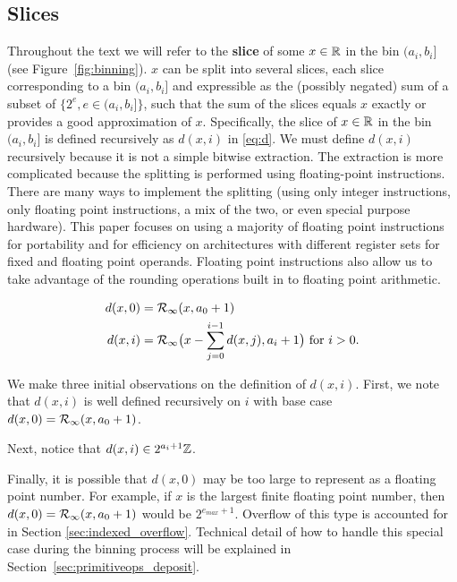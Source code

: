     \subsection{Slices}
    \label{sec:binning_slices}
    Throughout the text we will refer to the \textbf{slice} of some $x \in \mathbb{R}$
    in the bin $(a_i, b_i]$ (see Figure~\ref{fig:binning}).
    $x$ can be split into several slices, each slice
    corresponding to a bin $(a_i, b_i]$ and expressible as the (possibly
    negated) sum of a subset of $\{2^e, e \in (a_i, b_i]\}$, such that the sum
    of the slices equals $x$ exactly or provides a good approximation of $x$. Specifically, the slice
    of $x \in \mathbb{R}$ in the bin $(a_i, b_i]$ is defined recursively as $d(x, i)$
    in \eqref{eq:d}. We must define $d(x, i)$ recursively because it is not a
    simple bitwise extraction. The extraction is more complicated 
    because the splitting is performed using floating-point 
    instructions. There are many ways to implement the splitting 
    (using only integer instructions, only floating point instructions, 
    a mix of the two, or even special purpose hardware). This paper 
    focuses on using a majority of floating point instructions for portability and 
    for efficiency on architectures with different register
    sets for fixed and floating point operands.
    Floating point instructions also allow us to take advantage of the 
    rounding operations built in to floating point arithmetic.
    \begin{samepage}
    \begin{definition}
    \begin{equation}
    \begin{aligned}
      d(x,0) & = \mathcal{R}_\text{$\infty$}(x, a_0+1)\\
      d(x, i) & = \mathcal{R}_\text{$\infty$}\bigl(x - \sum\limits_{j=0}^{i - 1}d(x,j), a_i + 1\bigr)
        \text{ for } i > 0.
    \end{aligned}
      \label{eq:d}
    \end{equation}
    \end{definition}
    \end{samepage}

    We make three initial observations on the definition of $d(x, i)$. First,
    we note that $d(x, i)$ is well defined recursively on $i$ with base case
    $d(x, 0) = \mathcal{R}_\text{$\infty$}(x, a_0 + 1)$.

    Next, notice that $d(x, i) \in 2^{a_{i} + 1}\mathbb{Z}$.

    Finally, it is possible that $d(x, 0)$ may be too large to represent as a
    floating point number. For example, if $x$ is the largest finite floating point
    number, then $d(x,0)=\mathcal{R}_\text{$\infty$}(x, a_0+1)$ would be $2^{e_{max}+1}$.
    Overflow of this type is accounted for in Section \ref{sec:indexed_overflow}.
    Technical detail of how to handle this special case during the binning process
    will be explained in Section~\ref{sec:primitiveops_deposit}.

